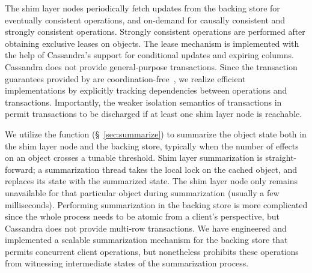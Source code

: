 The shim layer nodes periodically fetch updates from the backing store for
eventually consistent operations, and on-demand for causally consistent and
strongly consistent operations. Strongly consistent operations are performed
after obtaining exclusive leases on objects. The lease mechanism is
implemented with the help of Cassandra's support for conditional updates and
expiring columns. Cassandra does not provide general-purpose
transactions. Since the transaction guarantees provided by \name are
coordination-free~\cite{BailisHAT}, we realize efficient implementations by
explicitly tracking dependencies between operations and transactions.
Importantly, the weaker isolation semantics of transactions in \name permit
transactions to be discharged if at least one shim layer node is reachable.

We utilize the  function (\S~\ref{sec:summarize}) to summarize
the object state both in the shim layer node and the backing store, typically
when the number of effects on an object crosses a tunable threshold. Shim layer
summarization is straight-forward; a summarization thread takes the local lock
on the cached object, and replaces its state with the summarized state. The
shim layer node only remains unavailable for that particular object during
summarization (usually a few milliseconds). Performing summarization in the
backing store is more complicated since the whole process needs to be atomic
from a client's perspective, but Cassandra does not provide multi-row
transactions. We have engineered and implemented a scalable summarization
mechanism for the backing store that permits concurrent client operations, but
nonetheless prohibits these operations from witnessing intermediate states of
the summarization process.
